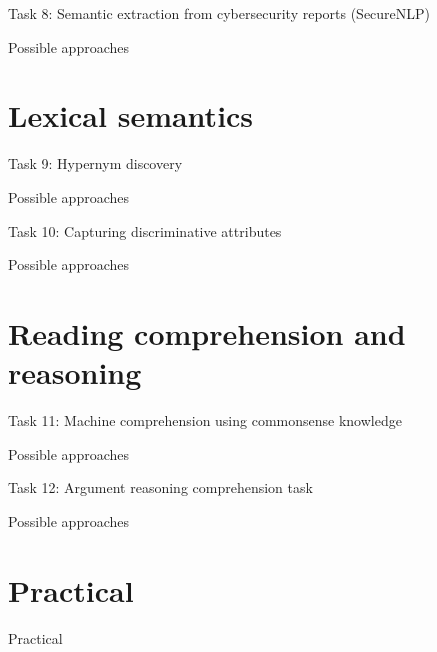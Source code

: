 \documentclass[10pt, compress]{beamer}
\begin{document}
\begin{frame}{Task 8: Semantic extraction from cybersecurity reports (SecureNLP)}


\end{frame}

\begin{frame}{Possible approaches}


\end{frame}

\section{Lexical semantics}

\begin{frame}{Task 9: Hypernym discovery}


\end{frame}

\begin{frame}{Possible approaches}


\end{frame}

\begin{frame}{Task 10: Capturing discriminative attributes}


\end{frame}

\begin{frame}{Possible approaches}


\end{frame}

\section{Reading comprehension and reasoning}

\begin{frame}{Task 11: Machine comprehension using commonsense knowledge}


\end{frame}

\begin{frame}{Possible approaches}


\end{frame}

\begin{frame}{Task 12: Argument reasoning comprehension task}


\end{frame}

\begin{frame}{Possible approaches}


\end{frame}

\section{Practical}

\begin{frame}{Practical}


\end{frame}
\end{document}
